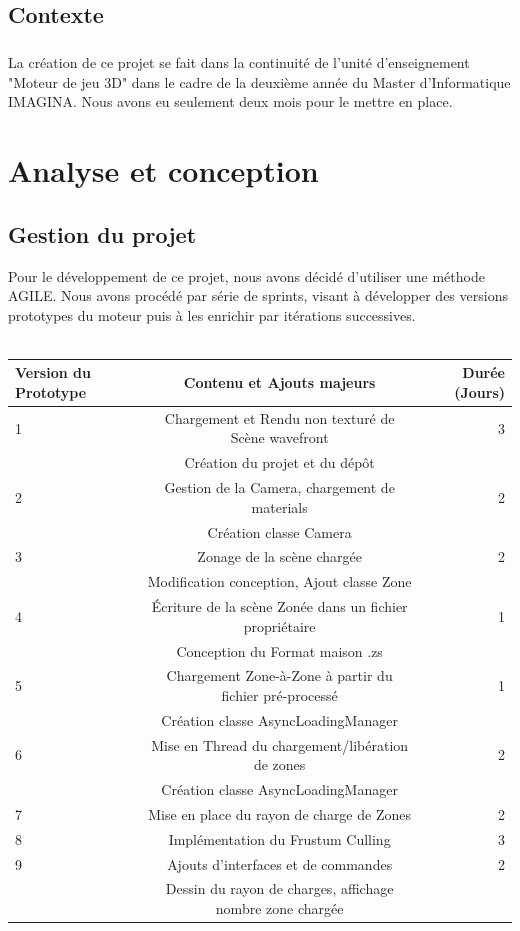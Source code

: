 \documentclass{report}
\begin{document}
		\section{Contexte}
			\paragraph{}La création de ce projet se fait dans la continuité de l'unité d'enseignement "Moteur de jeu 3D" dans le cadre de la deuxième année du Master d'Informatique IMAGINA. Nous avons eu  seulement deux mois pour le mettre en place.  

	\chapter{Analyse et conception}
		\section{Gestion du projet}
			Pour le développement de ce projet, nous avons décidé d'utiliser une méthode AGILE. Nous avons procédé par série de sprints, visant à développer des versions prototypes du moteur puis à les enrichir par itérations successives.\\ \\
		\begin{tabular}{| l | c || r ||}
			 \hline                 
				Version du Prototype & Contenu et Ajouts majeurs & Durée (Jours)\\
			\hline
				1 & Chargement et Rendu non texturé de Scène wavefront  & 3 \\
        					&  Création du projet et du dépôt & \\
			\hline
				2 & Gestion de la Camera, chargement de materials & 2 \\
        					&  Création classe Camera & \\
			\hline
				3 & Zonage de la scène chargée & 2 \\
        					& Modification conception, Ajout classe Zone & \\
			\hline
				4 & Écriture de la scène Zonée dans un fichier propriétaire & 1 \\
        					& Conception du Format maison .zs & \\
			\hline
				5 & Chargement Zone-à-Zone à partir du fichier pré-processé & 1 \\
        					& Création classe AsyncLoadingManager & \\
			\hline
				6 & Mise en Thread du chargement/libération de zones & 2 \\
        					& Création classe AsyncLoadingManager & \\
			\hline
				7 & Mise en place du rayon de charge de Zones & 2 \\
			\hline
				8 & Implémentation du Frustum Culling & 3 \\
			\hline
				9 & Ajouts d'interfaces et de commandes& 2 \\
					& Dessin du rayon de charges, affichage nombre zone chargée& \\
			\hline



 \end{tabular}
\newpage
\end{document}
